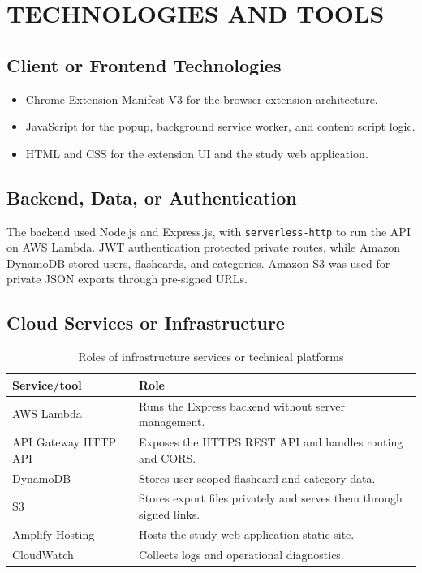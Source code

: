 \chapter{TECHNOLOGIES AND TOOLS}

\section{Client or Frontend Technologies}

\begin{itemize}
  \item Chrome Extension Manifest V3 for the browser extension architecture.
  \item JavaScript for the popup, background service worker, and content
  script logic.
  \item HTML and CSS for the extension UI and the study web application.
\end{itemize}

\section{Backend, Data, or Authentication}

The backend used Node.js and Express.js, with \texttt{serverless-http} to run
the API on AWS Lambda. JWT authentication protected private routes, while
Amazon DynamoDB stored users, flashcards, and categories. Amazon S3 was used
for private JSON exports through pre-signed URLs.

\section{Cloud Services or Infrastructure}

\begin{table}[H]
  \centering
  \caption{Roles of infrastructure services or technical platforms}
  \begin{tabularx}{\textwidth}{@{}P{4.1cm}Y@{}}
    \toprule
    \textbf{Service/tool} & \textbf{Role} \\
    \midrule
    AWS Lambda & Runs the Express backend without server management. \\
    API Gateway HTTP API & Exposes the HTTPS REST API and handles routing and
    CORS. \\
    DynamoDB & Stores user-scoped flashcard and category data. \\
    S3 & Stores export files privately and serves them through signed links. \\
    Amplify Hosting & Hosts the study web application static site. \\
    CloudWatch & Collects logs and operational diagnostics. \\
    \bottomrule
  \end{tabularx}
\end{table}

